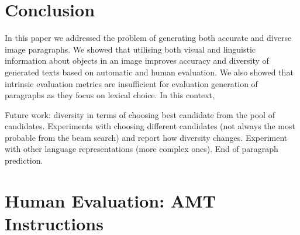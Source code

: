 \documentclass[11pt,a4paper]{article}
\begin{document}
\section{Conclusion}


In this paper we addressed the problem of generating both accurate and diverse image paragraphs.
We showed that utilising both visual and linguistic information about objects in an image improves accuracy and diversity of generated texts based on automatic and human evaluation.
We also showed that intrinsic evaluation metrics are insufficient for evaluation generation of paragraphs as they focus on lexical choice.
In this context, 


Future work: diversity in terms of choosing best candidate from the pool of candidates.
Experiments with choosing different candidates (not always the most probable from the beam search) and report how diversity changes.
Experiment with other language representations (more complex ones).
End of paragraph prediction.







\appendix

\section{Human Evaluation: AMT Instructions}
\label{sec:supplemental}
\end{document}
